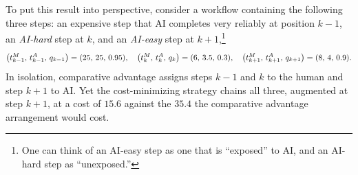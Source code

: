 To put this result into perspective, consider a workflow containing the following three steps: an expensive step that AI completes very reliably at position $k-1$, an \emph{AI-hard} step at $k$, and an \emph{AI-easy} step at $k+1$,\footnote{One can think of an AI-easy step as one that is ``exposed'' to AI, and an AI-hard step as ``unexposed.''}
\begingroup\smalldisplay
\[
\bigl(t^{M}_{k-1},\, t^{A}_{k-1},\, q_{k-1}\bigr) = (25,\,25,\,0.95), \quad
\bigl(t^{M}_{k},\, t^{A}_{k},\, q_k\bigr) = (6,\,3.5,\,0.3), \quad
\bigl(t^{M}_{k+1},\, t^{A}_{k+1},\, q_{k+1}\bigr) = (8,\,4,\,0.9).
\]
\endgroup
In isolation, comparative advantage assigns steps $k-1$ and $k$ to the human and step $k+1$ to AI.
Yet the cost-minimizing strategy chains all three, augmented at step $k+1$, at a cost of $15.6$ against the $35.4$ the comparative advantage arrangement would cost.

